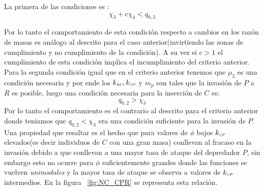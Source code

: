 La primera de las condiciones es :
\begin{equation}
  \chi_3 + c \chi_4 < q_{0,2}
\end{equation}

Por lo tanto el comportamiento de esta condici\'on respecto a cambios en los raz\'on de masas es an\'alogo al descrito para el caso anterior(invirtiendo las zonas de cumplimiento y no cumplimiento de la condici\'on). A su vez si $c>1$ el cumplimiento de esta condici\'on implica el incumplimiento del criterio anterior.\\
Para la segunda condici\'on igual que en el criterio anterior tenemos que $\mu_2$ es una condici\'on necesaria y por ende los $k_{\textit{\tiny RC}}, k_{\textit{\tiny CP}}$ y $m_p$ son tales que la invasi\'on de $P$ a $R$ es posible, luego una condici\'on necesaria para la inserci\'on de $C$ es:
\begin{equation}
  q_{0,2} > \chi_3
\end{equation}
Por lo tanto el comportamiento es el contrario al descrito para el criterio anterior donde teniamos que $q_{0,2} < \chi_3$ era una condici\'on suficiente para la invasi\'on de $P$. Una propiedad que resaltar es el hecho que para valores de $\phi$ bajos $k_{\textit{\tiny CP}}$ elevados(es decir individuos de $C$ con una gran masa) conllevan al fracaso en la invasi\'on debido a que conllevan a una mayor tasa de ataque del depredador $P$, sin embargo esto no ocurre para $\phi$ suficientemente grandes
 donde las funciones se vuelven \emph{unimodales} y la mayor tasa de ataque se observa a valores de $k_{\textit{\tiny CP}}$ intermedios. En la figura ~\ref{fig:NC_CPR} se representa esta relaci\'on. \\


